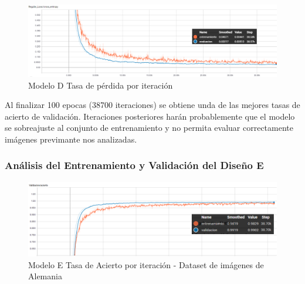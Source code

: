 			\begin{figure}[H]
				\begin{center}
				\includegraphics[width=1\textwidth]{images/desarrollo/trainResults/german/model6Loss} 
				\end{center}
				\begin{center}
				\caption{\small{Modelo D Tasa de pérdida por iteración}}
				
				{\small{\fontsize{10}{16.8}\selectfont {Fuente: Elaboración propia}}}
				\end{center}
				\vspace{-1.5em}
			\end{figure}

			Al finalizar 100 epocas (38700 iteraciones) se obtiene unda de las mejores tasas de acierto de validación. Iteraciones posteriores harán probablemente que el modelo se sobreajuste al conjunto de entrenamiento y no permita evaluar correctamente imágenes previmante nos analizadas.
			

		\subsubsection{Análisis del Entrenamiento y Validación del Diseño E} 
			\begin{figure}[H]
				\begin{center}
				\includegraphics[width=1\textwidth]{images/desarrollo/trainResults/german/model7Acierto} 
				\end{center}
				\begin{center}
				\caption{\small{Modelo E Tasa de Acierto por iteración - Dataset de imágenes de Alemania  }}
				
				{\small{\fontsize{10}{16.8}\selectfont {Fuente: Elaboración propia}}}
				\end{center}
				\vspace{-1.5em}
			\end{figure}
		
